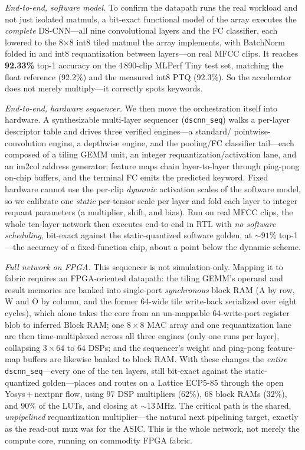 \documentclass[conference]{IEEEtran}
\newcommand{\approxs}{\ensuremath{\sim}}
\begin{document}
\emph{End-to-end, software model.} To confirm the datapath runs the real workload
and not just isolated matmuls, a bit-exact functional model of the array executes
the \emph{complete} DS-CNN---all nine convolutional layers and the FC classifier,
each lowered to the 8$\times$8 int8 tiled matmul the array implements, with
BatchNorm folded in and int8 requantization between layers---on real MFCC clips.
It reaches \textbf{92.33\%} top-1 accuracy on the 4\,890-clip MLPerf Tiny test
set, matching the float reference (92.2\%) and the measured int8 PTQ (92.3\%).
So the accelerator does not merely multiply---it correctly spots keywords.

\emph{End-to-end, hardware sequencer.} We then move the orchestration itself into
hardware. A synthesizable multi-layer sequencer (\texttt{dscnn\_seq}) walks a
per-layer descriptor table and drives three verified engines---a standard/%
pointwise-convolution engine, a depthwise engine, and the pooling/FC classifier
tail---each composed of a tiling GEMM unit, an integer requantization/activation
lane, and an im2col address generator; feature maps chain layer-to-layer through
ping-pong on-chip buffers, and the terminal FC emits the predicted keyword. Fixed
hardware cannot use the per-clip \emph{dynamic} activation scales of the software
model, so we calibrate one \emph{static} per-tensor scale per layer and fold each
layer to integer requant parameters (a multiplier, shift, and bias). Run on real
MFCC clips, the whole ten-layer network then executes end-to-end in RTL with
\emph{no software scheduling}, bit-exact against the static-quantized software
golden, at \approxs$91\%$ top-1---the accuracy of a fixed-function chip, about a
point below the dynamic scheme.

\emph{Full network on FPGA.} This sequencer is not simulation-only. Mapping it to
fabric requires an FPGA-oriented datapath: the tiling GEMM's operand and result
memories are banked into single-port \emph{synchronous} block RAM (A by row, W and
O by column, and the former 64-wide tile write-back serialized over eight cycles),
which alone takes the core from an un-mappable 64-write-port register blob to
inferred Block RAM; one $8\times8$ MAC array and one requantization lane are then
time-multiplexed across all three engines (only one runs per layer), collapsing
$3\times64$ to $64$ DSPs; and the sequencer's weight and ping-pong feature-map
buffers are likewise banked to block RAM. With these changes the \emph{entire}
\texttt{dscnn\_seq}---every one of the ten layers, still bit-exact against the
static-quantized golden---places and routes on a Lattice ECP5-85 through the open
Yosys\,+\,nextpnr flow, using $97$ DSP multipliers ($62\%$), $68$ block RAMs
($32\%$), and $90\%$ of the LUTs, and closing at \approxs$13$\,MHz. The critical
path is the shared, \emph{unpipelined} requantization multiplier---the natural next
pipelining target, exactly as the read-out mux was for the ASIC. This is the whole
network, not merely the compute core, running on commodity FPGA fabric.
\end{document}
